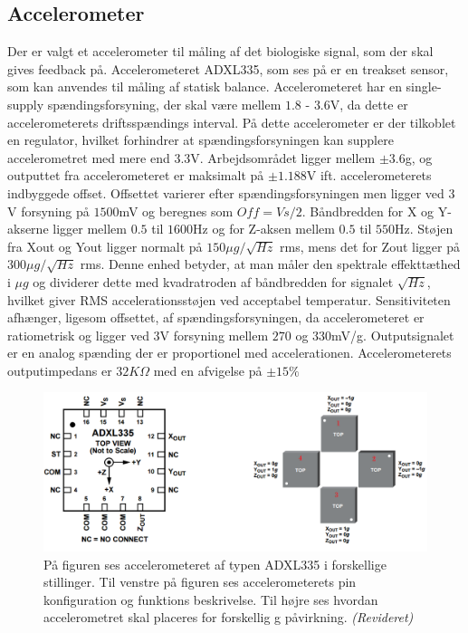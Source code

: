 \subsection{Accelerometer}\label{Subsec:AccTeori}
Der er valgt et accelerometer til måling af det biologiske signal, som der skal gives feedback på. Accelerometeret ADXL335, som ses på  er en treakset sensor, som kan anvendes til måling af statisk balance. Accelerometeret har en single-supply spændingsforsyning, der skal være mellem $1.8$ - $3.6$V, da dette er accelerometerets driftsspændings interval. På dette accelerometer er der tilkoblet en regulator, hvilket forhindrer at spændingsforsyningen kan supplere accelerometret med mere end $3.3$V.  Arbejdsområdet ligger mellem $\pm3.6$g, og outputtet fra accelerometeret er maksimalt på $\pm1.188$V ift. accelerometerets indbyggede offset. Offsettet varierer efter spændingsforsyningen men ligger ved $3$V forsyning på $1500$mV og beregnes som $Off = Vs/2$. Båndbredden for X og Y-akserne ligger mellem $0.5$ til $1600$Hz og for Z-aksen mellem $0.5$ til $550$Hz. Støjen fra Xout og Yout ligger normalt på $150\mu g/\sqrt{Hz}$ rms, mens det for Zout ligger på $300\mu g/\sqrt{Hz}$ rms. Denne enhed betyder, at man måler den spektrale effekttæthed i $\mu g$ og dividerer dette med kvadratroden af båndbredden for signalet $\sqrt{Hz}$, hvilket giver RMS accelerationsstøjen ved acceptabel temperatur. Sensitiviteten afhænger, ligesom offsettet, af spændingsforsyningen, da accelerometeret er ratiometrisk og ligger ved $3$V forsyning mellem $270$ og $330$mV/g. Outputsignalet er en analog spænding der er proportionel med accelerationen. Accelerometerets outputimpedans er $32K\Omega$ med en afvigelse på $\pm15\%$ \cite{Devices2009} %

\begin{figure}[H]
	\centering 
	\includegraphics[scale=0.5]{figures/cProblemloesning/ADXL335_2.JPG}
	\caption{På figuren ses accelerometeret af typen ADXL335 i forskellige stillinger. Til venstre på figuren ses accelerometerets pin konfiguration og funktions beskrivelse. Til højre ses hvordan accelerometret skal placeres for forskellig g påvirkning. \textit{(Revideret)} \cite{Devices2009}}
	\label{ADXL335}
\end{figure}

